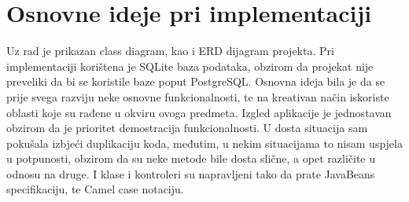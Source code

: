 \chapter{Osnovne ideje pri implementaciji}

Uz rad je prikazan class diagram, kao i ERD dijagram projekta. Pri implementaciji korištena je SQLite baza podataka, obzirom da projekat nije preveliki da bi se koristile baze poput PostgreSQL. Osnovna ideja bila je da se prije svega razviju neke osnovne funkcionalnosti, te na kreativan način iskoriste oblasti koje su rađene u okviru ovoga predmeta. Izgled aplikacije je jednostavan obzirom da je prioritet demostracija funkcionalnosti. U dosta situacija sam pokušala izbjeći duplikaciju koda, međutim, u nekim situacijama to nisam uspjela u potpunosti, obzirom da su neke metode bile dosta slične, a opet različite u odnosu na druge. I klase i kontroleri su napravljeni tako da prate JavaBeans specifikaciju, te Camel case notaciju. 
